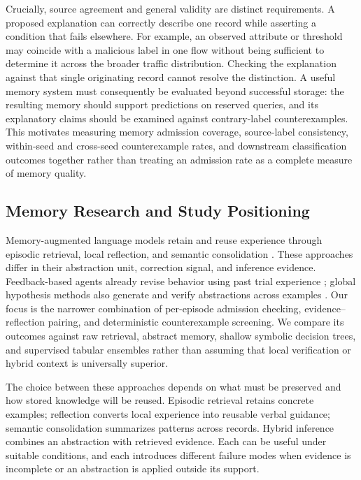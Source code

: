 \documentclass[10pt,a4paper,onecolumn]{article}
\theoremstyle{definition}
\theoremstyle{remark}
\begin{document}
Crucially, source agreement and general validity are distinct requirements. A proposed explanation can correctly describe one record while asserting a condition that fails elsewhere. For example, an observed attribute or threshold may coincide with a malicious label in one flow without being sufficient to determine it across the broader traffic distribution. Checking the explanation against that single originating record cannot resolve the distinction. A useful memory system must consequently be evaluated beyond successful storage: the resulting memory should support predictions on reserved queries, and its explanatory claims should be examined against contrary-label counterexamples. This motivates measuring memory admission coverage, source-label consistency, within-seed and cross-seed counterexample rates, and downstream classification outcomes together rather than treating an admission rate as a complete measure of memory quality.

\subsection{Memory Research and Study Positioning}
Memory-augmented language models retain and reuse experience through episodic retrieval, local reflection, and semantic consolidation \cite{wu2025from,zhang2024survey}. These approaches differ in their abstraction unit, correction signal, and inference evidence. Feedback-based agents already revise behavior using past trial experience \cite{shinn2023reflexion,wang2024voyager}; global hypothesis methods also generate and verify abstractions across examples \cite{agarwal2026hypothesis,he2024idea}. Our focus is the narrower combination of per-episode admission checking, evidence--reflection pairing, and deterministic counterexample screening. We compare its outcomes against raw retrieval, abstract memory, shallow symbolic decision trees, and supervised tabular ensembles rather than assuming that local verification or hybrid context is universally superior.

The choice between these approaches depends on what must be preserved and how stored knowledge will be reused. Episodic retrieval retains concrete examples; reflection converts local experience into reusable verbal guidance; semantic consolidation summarizes patterns across records. Hybrid inference combines an abstraction with retrieved evidence. Each can be useful under suitable conditions, and each introduces different failure modes when evidence is incomplete or an abstraction is applied outside its support.
\end{document}
